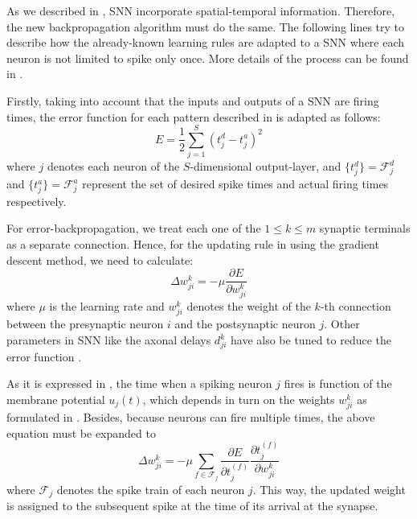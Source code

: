 
\label{subsec:snnbackprop}
As we described in , SNN incorporate spatial-temporal information. Therefore, the new backpropagation algorithm must do the same. The following lines try to describe how the already-known learning rules are adapted to a SNN where each neuron is not limited to spike only once.
More details of the process can be found in \cite{booij2005gradient}.

Firstly, taking into account that the inputs and outputs of a SNN are firing times, the error function for each pattern described in  is adapted as follows:
\begin{equation}
E=\frac{1}{2}\sum_{j=1}^{S} (t_{j}^{d}-t_{j}^{a})^2
\label{eq:patternerrorfunctionSNN}
\end{equation}
where $j$ denotes each neuron of the $S$-dimensional output-layer, and $\{t_{j}^{d}\}=\mathcal{F}_{j}^{d}$ and $\{t_{j}^{a}\}=\mathcal{F}_{j}^{a}$ represent the set of desired spike times and actual firing times respectively.

For error-backpropagation, we treat each one of the $1 \leq k \leq m$ synaptic terminals as a separate connection. Hence, for the 
updating rule in  using the gradient descent method, we need to calculate:
\begin{equation}
\Delta w_{ji}^{k}= -\mu\frac{\partial E}{\partial w_{ji}^{k}}
\label{eq:updatingruleSNN}
\end{equation}
where $\mu$ is the learning rate and $w_{ji}^{k}$ denotes the weight of the $k$-th connection between the presynaptic neuron $i$ and the postsynaptic neuron $j$. 
Other parameters in SNN like the axonal delays $d_{ji}^{k}$ have also be tuned to reduce the error function \cite{schrauwen2004extending}.


As it is expressed in ,
the time when a spiking neuron $j$ fires is function of the membrane potential $u_{j}(t)$, which depends in turn on the weights $w_{ji}^{k}$ as formulated in . Besides, because neurons can fire multiple times, the above equation must be expanded to
\begin{equation}
\Delta w_{ji}^{k}= -\mu
\sum_{f\in \mathcal{F}_{j}}
\frac{\partial E}{\partial t_{j}^{(f)}}
\frac{\partial t_{j}^{(f)}}{\partial w_{ji}^{k}}
\label{eq:updatingruleSNNmultiplespikes}
\end{equation}
where $\mathcal{F}_{j}$ denotes the spike train of each neuron $j$. This way, the updated weight is assigned to the subsequent spike at the time of its arrival at the synapse.

